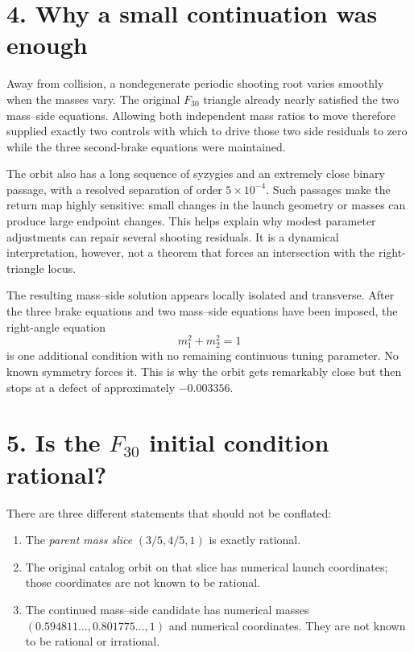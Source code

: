 \documentclass[11pt]{article}
\begin{document}
\section*{4. Why a small continuation was enough}

Away from collision, a nondegenerate periodic shooting root varies smoothly
when the masses vary.  The original $F_{30}$ triangle already nearly satisfied
the two mass--side equations.  Allowing both independent mass ratios to move
therefore supplied exactly two controls with which to drive those two side
residuals to zero while the three second-brake equations were maintained.

The orbit also has a long sequence of syzygies and an extremely close binary
passage, with a resolved separation of order $5\times10^{-4}$.  Such passages
make the return map highly sensitive: small changes in the launch geometry or
masses can produce large endpoint changes.  This helps explain why modest
parameter adjustments can repair several shooting residuals.  It is a
dynamical interpretation, however, not a theorem that forces an intersection
with the right-triangle locus.

The resulting mass--side solution appears locally isolated and transverse.
After the three brake equations and two mass--side equations have been imposed,
the right-angle equation
\[
 m_1^2+m_2^2=1
\]
is one additional condition with no remaining continuous tuning parameter.
No known symmetry forces it.  This is why the orbit gets remarkably close but
then stops at a defect of approximately $-0.003356$.

\section*{5. Is the $F_{30}$ initial condition rational?}

\begin{center}
\end{center}

There are three different statements that should not be conflated:
\begin{enumerate}
  \item The \emph{parent mass slice} $(3/5,4/5,1)$ is exactly rational.
  \item The original catalog orbit on that slice has numerical launch
        coordinates; those coordinates are not known to be rational.
  \item The continued mass--side candidate has numerical masses
        $(0.594811\ldots,0.801775\ldots,1)$ and numerical coordinates.  They
        are not known to be rational or irrational.
\end{enumerate}
\end{document}
